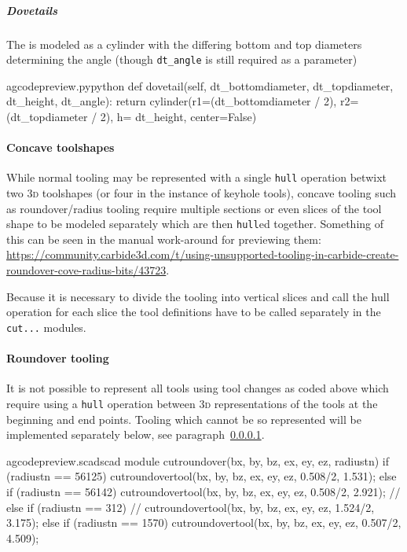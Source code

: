 \documentclass{ltxdoc}
\begin{document}
\subparagraph{Dovetails}

\label{subpara:dovetails}The  is modeled as a cylinder with the differing bottom and top diameters determining the angle (though \verb|dt_angle| is still required as a parameter)

\lstset{firstnumber=\thegcpy}
\begin{writecode}{a}{gcodepreview.py}{python}
    def dovetail(self, dt_bottomdiameter, dt_topdiameter, dt_height, dt_angle):
        return cylinder(r1=(dt_bottomdiameter / 2), r2=(dt_topdiameter / 2), h= dt_height, center=False)

\end{writecode}
\addtocounter{gcpy}{3}

\paragraph{Concave toolshapes}
\label{para:concavetoolshapes} 
While normal tooling may be represented with a single \texttt{hull} operation betwixt two \textsc{3d} toolshapes (or four in the instance of keyhole tools), concave tooling such as roundover/radius tooling require multiple sections or even slices of the tool shape to be modeled separately which are then \texttt{hull}ed together. Something of this can be seen in the manual work-around for previewing them: \url{https://community.carbide3d.com/t/using-unsupported-tooling-in-carbide-create-roundover-cove-radius-bits/43723}.

Because it is necessary to divide the tooling into vertical slices and call the hull operation for each slice the tool definitions have to be called separately in the \verb|cut...| modules.

\paragraph{Roundover tooling}

\label{para:roundover} It is not possible to represent all tools using tool changes as coded above which require using a \texttt{hull} operation between \textsc{3d} representations of the tools at the beginning and end points. Tooling which cannot be so represented will be implemented separately below, see paragraph~\ref{para:concavetoolshapes}.

\lstset{firstnumber=\thegcpscad}
\begin{writecode}{a}{gcodepreview.scad}{scad}
module cutroundover(bx, by, bz, ex, ey, ez, radiustn) {
    if (radiustn == 56125) {
        cutroundovertool(bx, by, bz, ex, ey, ez, 0.508/2, 1.531);
    } else if (radiustn == 56142) {
        cutroundovertool(bx, by, bz, ex, ey, ez, 0.508/2, 2.921);
//    } else if (radiustn == 312) {
//        cutroundovertool(bx, by, bz, ex, ey, ez, 1.524/2, 3.175);
    } else if (radiustn == 1570) {
        cutroundovertool(bx, by, bz, ex, ey, ez, 0.507/2, 4.509);
    }
}

\end{writecode}
\addtocounter{gcpscad}{12}
\end{document}
